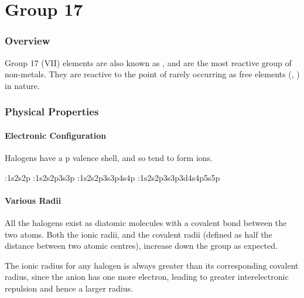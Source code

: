 

\pagebreak
\part{Group 17}

	\section{Overview}

		Group 17 (VII) elements are also known as , and are the most reactive group of non-metals.
		They are reactive to the point of rarely occurring as free elements (, ) in nature.


	\section{Physical Properties}

		\subsection{Electronic Configuration}

			Halogens have a p valence shell, and so tend to form  ions.


			\tabto{0mm}:\tabto{10mm}1s\sps{2}2s2p
			\tabto{0mm}\ch{\Cl}:\tabto{10mm}1s\sps{2}2s2p3s3p
			\tabto{0mm}:\tabto{10mm}1s\sps{2}2s2p3s3p4s4p
			\tabto{0mm}:\tabto{10mm}1s\sps{2}2s2p3s3p3d4s4p5s5p



		\subsection{Various Radii}

			All the halogens exist as diatomic molecules with a covalent bond between the two atoms. Both the ionic radii, and the covalent
			radii (defined as half the distance between two atomic centres), increase down the group as expected.

			The ionic radius for any halogen is always greater than its corresponding covalent radius, since the anion has one more electron,
			leading to greater interelectronic repulsion and hence a larger radius.

